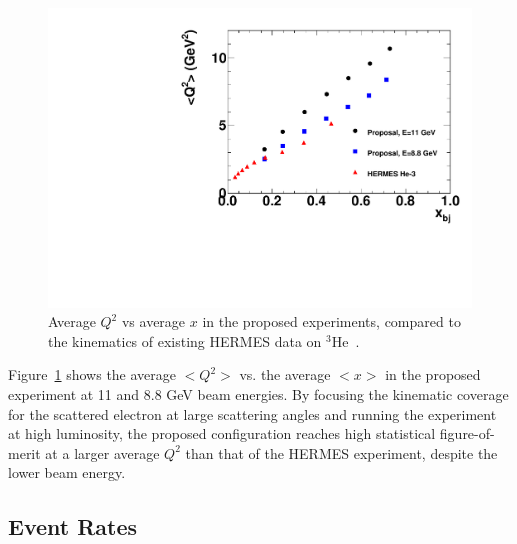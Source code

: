 \begin{figure}[h]
  \begin{center}
    \includegraphics[width=.75\textwidth]{figures/Q2_HERMES_compare.pdf}
  \end{center}
  \caption{\label{fig:Q2vsxHERMEScompare} Average $Q^2$ vs average $x$ in the proposed experiments, compared to the kinematics of existing HERMES data on $^3$He~\cite{Ackerstaff:1999ey}.}
\end{figure}
Figure~\ref{fig:Q2vsxHERMEScompare} shows the average $<Q^2>$ vs. the average $<x>$ in the proposed experiment at 11 and 8.8 GeV beam energies. By focusing the kinematic coverage for the scattered electron at large scattering angles and running the experiment at high luminosity, the proposed configuration reaches high statistical figure-of-merit at a larger average $Q^2$ than that of the HERMES experiment, despite the lower beam energy. 

\subsection{Event Rates}

